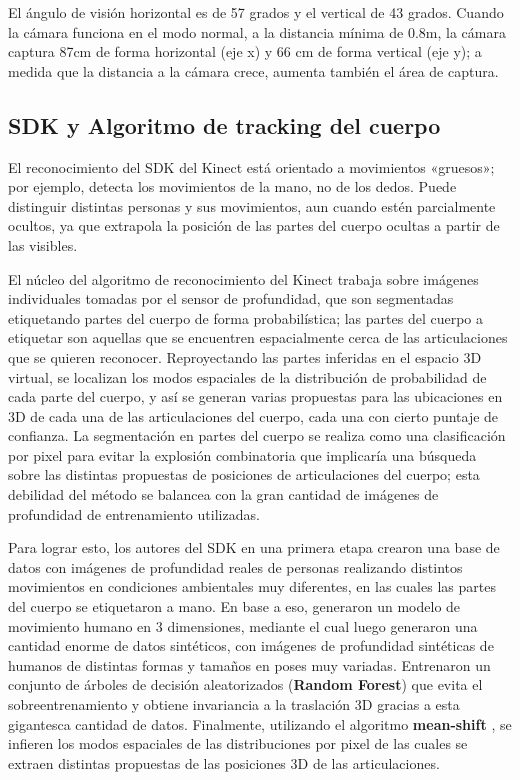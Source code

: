 
El ángulo de visión horizontal es de 57 grados y el vertical de 43 grados. Cuando la cámara  funciona en el modo normal, a la distancia mínima de 0.8m, la cámara captura 87cm de forma horizontal (eje x) y 66 cm de forma vertical (eje y); a medida que la distancia a la cámara crece, aumenta también el área de captura.


\subsection{SDK y Algoritmo de tracking del cuerpo}

El reconocimiento del SDK del Kinect está orientado a movimientos «gruesos»; por ejemplo, detecta los movimientos de la mano, no de los dedos. Puede distinguir distintas personas y sus movimientos, aun cuando estén parcialmente ocultos, ya que extrapola la posición de las partes del cuerpo ocultas a partir de las visibles. 

El núcleo del algoritmo de reconocimiento del Kinect trabaja sobre imágenes individuales tomadas por el sensor de profundidad, que son segmentadas etiquetando partes del cuerpo de forma probabilística; las partes del cuerpo a etiquetar son aquellas que se encuentren espacialmente cerca de las articulaciones que se quieren reconocer. Reproyectando las partes inferidas en el espacio 3D virtual, se localizan los modos espaciales de la distribución de probabilidad de cada parte del cuerpo, y así se generan varias propuestas para las ubicaciones en 3D  de cada una de las articulaciones del cuerpo, cada una con cierto puntaje de confianza. La segmentación en partes del cuerpo se realiza como una clasificación por pixel para evitar la explosión combinatoria que implicaría una búsqueda sobre las distintas propuestas de posiciones de articulaciones del cuerpo; esta debilidad del método se balancea con la gran cantidad de imágenes de profundidad de entrenamiento utilizadas. 

Para lograr esto, los autores del SDK en una primera etapa crearon una base de datos con imágenes de profundidad reales de personas realizando distintos movimientos en condiciones ambientales muy diferentes, en las cuales las partes del cuerpo se etiquetaron a mano. En base a eso, generaron un modelo de movimiento humano en 3 dimensiones, mediante el cual luego generaron una cantidad enorme de datos sintéticos, con imágenes de profundidad sintéticas de humanos de distintas formas y tamaños en poses muy variadas. Entrenaron un conjunto de árboles de decisión aleatorizados (\textbf{Random Forest}) \cite{breiman2001random} que evita el sobreentrenamiento y obtiene invariancia a la traslación 3D gracias a esta gigantesca cantidad de datos. Finalmente, utilizando el algoritmo \textbf{mean-shift} \cite{comaniciu2002mean}, se infieren los modos espaciales de las distribuciones por pixel de las cuales se extraen distintas propuestas de las posiciones 3D de las articulaciones. 

